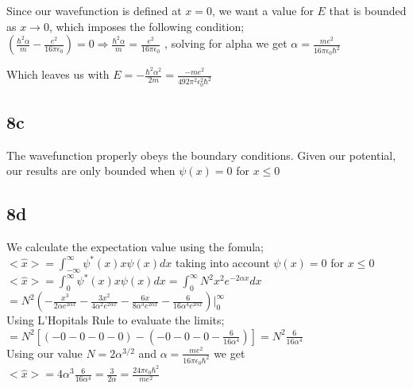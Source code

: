 \documentclass{article}
\begin{document}
Since our wavefunction is defined at $x=0$, we want a value for $E$ that is bounded as $x\rightarrow0$, which imposes the following condition;\\

$(\frac{\hbar^2\alpha}{m}-\frac{e^2}{16\pi\epsilon_0})=0\Rightarrow\frac{\hbar^2\alpha}{m}=\frac{e^2}{16\pi\epsilon_0}$ , solving for alpha we get $\alpha=\frac{me^2}{16\pi\epsilon_0\hbar^2}$

Which leaves us with $E=-\frac{\hbar^2\alpha^2}{2m}=\frac{-me^2}{492\pi^2\epsilon_0^2\hbar^2}$\\

\subsection*{8c}

The wavefunction properly obeys the boundary conditions. Given our potential, our results are only bounded when $\psi(x)=0$ for $x\leq0$\\

\subsection*{8d}

We calculate the expectation value using the fomula;\\

$<\hat{x}>={ \displaystyle \int_{-\infty}^{\infty }}\psi^*(x)x\psi(x)dx$ taking into account $\psi(x)=0$ for $x\leq0$\\ 

$<\hat{x}>={ \displaystyle \int_{0}^{\infty} }\psi^*(x)x\psi(x)dx={ \displaystyle \int_{0}^{\infty} }N^2x^2e^{-2\alpha x}dx$\\

$=N^2(-\frac{x^3}{2\alpha e^{2\alpha x}}-\frac{3x^2}{4\alpha^2 e^{2\alpha x}}-\frac{6x}{8\alpha^3 e^{2\alpha x}}-\frac{6}{16\alpha^4 e^{2\alpha x}})|_0^\infty$\\

Using L'Hopitals Rule to evaluate the limits;\\

$=N^2[(-0-0-0-0)-(-0-0-0-\frac{6}{16\alpha^4})]=N^2\frac{6}{16\alpha^4}$\\

Using our value $N=2\alpha^{3/2}$ and $\alpha=\frac{me^2}{16\pi\epsilon_0\hbar^2}$ we get \\

$<\hat{x}>=4\alpha^3\frac{6}{16\alpha^4}=\frac{3}{2\alpha}=\frac{24\pi\epsilon_0\hbar^2}{me^2}$\\
\end{document}
